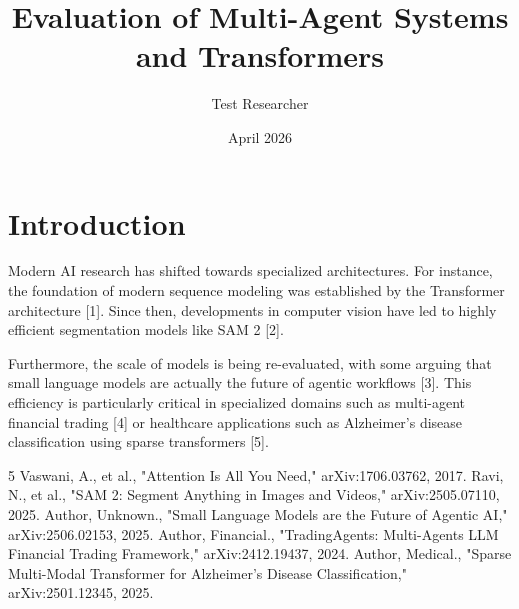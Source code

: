 \documentclass{article}
\title{Evaluation of Multi-Agent Systems and Transformers}
\author{Test Researcher}
\date{April 2026}
\begin{document}
\maketitle

\section{Introduction}
Modern AI research has shifted towards specialized architectures. 
For instance, the foundation of modern sequence modeling was established by the Transformer architecture [1]. 
Since then, developments in computer vision have led to highly efficient segmentation models like SAM 2 [2].

Furthermore, the scale of models is being re-evaluated, with some arguing that small language models are actually the future of agentic workflows [3]. 
This efficiency is particularly critical in specialized domains such as multi-agent financial trading [4] 
or healthcare applications such as Alzheimer's disease classification using sparse transformers [5].

\begin{thebibliography}{5}
 Vaswani, A., et al., "Attention Is All You Need," arXiv:1706.03762, 2017.
 Ravi, N., et al., "SAM 2: Segment Anything in Images and Videos," arXiv:2505.07110, 2025.
 Author, Unknown., "Small Language Models are the Future of Agentic AI," arXiv:2506.02153, 2025.
 Author, Financial., "TradingAgents: Multi-Agents LLM Financial Trading Framework," arXiv:2412.19437, 2024.
 Author, Medical., "Sparse Multi-Modal Transformer for Alzheimer’s Disease Classification," arXiv:2501.12345, 2025.
\end{thebibliography}
\end{document}
